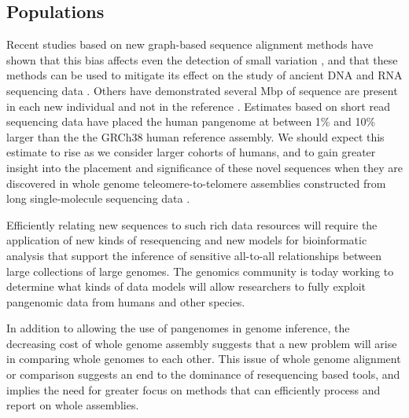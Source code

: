 \subsection{Populations}

Recent studies based on new graph-based sequence alignment methods have shown that this bias affects even the detection of small variation \cite{eggertsson2017graphtyper,Garrison_2018}, and that these methods can be used to mitigate its effect on the study of ancient DNA \cite{martiniano2019removing} and RNA sequencing data \cite{Kim_2019}.
Others have demonstrated several Mbp of sequence are present in each new individual and not in the reference \cite{li2010building,Steinberg_2016,Audano_2019}.
Estimates based on short read sequencing data have placed the human pangenome at between 1\% \cite{li2010building} and 10\% \cite{sherman2019assembly} larger than the the GRCh38 human reference assembly.
We should expect this estimate to rise as we consider larger cohorts of humans, and to gain greater insight into the placement and significance of these novel sequences when they are discovered in whole genome teleomere-to-telomere assemblies constructed from long single-molecule sequencing data \cite{miga2019telomere,Langley_2019}.

Efficiently relating new sequences to such rich data resources will require the application of new kinds of resequencing and new models for bioinformatic analysis that support the inference of sensitive all-to-all relationships between large collections of large genomes.
The genomics community is today working to determine what kinds of data models will allow researchers to fully exploit pangenomic data from humans and other species.

In addition to allowing the use of pangenomes in genome inference, the decreasing cost of whole genome assembly suggests that a new problem will arise in comparing whole genomes to each other.
This issue of whole genome alignment or comparison suggests an end to the dominance of resequencing based tools, and implies the need for greater focus on methods that can efficiently process and report on whole assemblies.

